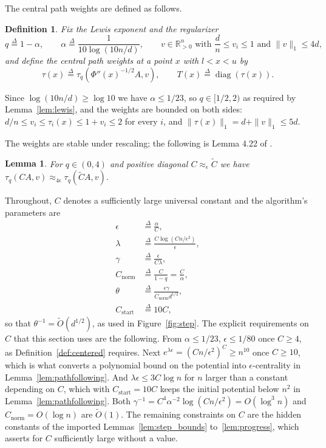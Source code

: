 \documentclass[11pt]{article}
\newtheorem{lemma}{Lemma}[section]
\newtheorem{definition}{Definition}[section]
\newcommand{\R}{\mathbb R}
\newcommand{\diag}{\operatorname{diag}}
\renewcommand{\O}{\widetilde O}
\newcommand{\defeq}{\stackrel{\Delta}{=}}
\newcommand{\Cnorm}{C_{\mathrm{norm}}}
\begin{document}
The central path weights are defined as follows.

\begin{definition}
\label{def:central_weights}
Fix the Lewis exponent and the regularizer
\[
q \defeq 1 - \alpha,
\qquad
\alpha \defeq \frac{1}{10 \log(10 n / d)},
\qquad
v \in \R^{n}_{>0}
\text{ with }
\frac{d}{n} \le v_i \le 1
\text{ and }
\|v\|_1 \le 4 d,
\]
and define the central path weights at a point $x$ with
$l < x < u$ by
\[
\tau(x)
\defeq
\tau_{q}\left( \Phi''(x)^{-1/2} A, v \right),
\qquad
T(x) \defeq \diag(\tau(x)).
\]
\end{definition}

Since $\log(10 n / d) \ge \log 10$ we have
$\alpha \le 1/23$, so
$q \in [1/2, 2)$ as required by Lemma~\ref{lem:lewis}, and the weights are
bounded on both sides: $d / n \le v_i \le \tau_i(x) \le 1 + v_i \le 2$ for every
$i$, and
$\|\tau(x)\|_1 = d + \|v\|_1 \le 5 d$.

The weights are stable under rescaling; the following is Lemma 4.22 of
\cite{BLLSSSW21}.

\begin{lemma}
\label{lem:lewis_approx}
For $q \in (0, 4)$ and positive diagonal
$C \approx_{\epsilon} \widetilde{C}$ we have
$\tau_{q}(C A, v) \approx_{4 \epsilon} \tau_{q}(\widetilde{C} A, v)$.
\end{lemma}

Throughout, $C$ denotes a sufficiently large universal constant and the
algorithm's parameters are
\begin{equation}
\label{eq:parameters}
\begin{aligned}
\epsilon &\defeq \frac{\alpha}{C}, \\
\lambda &\defeq \frac{C \log(C n / \epsilon^2)}{\epsilon}, \\
\gamma &\defeq \frac{\epsilon}{C \lambda}, \\
\Cnorm &\defeq \frac{C}{1 - q} = \frac{C}{\alpha}, \\
\theta &\defeq \frac{\epsilon \gamma}{\Cnorm d^{1/2}}, \\
C_{\mathrm{start}} &\defeq 10 C,
\end{aligned}
\end{equation}
so that $\theta^{-1} = \O(d^{1/2})$, as used in Figure~\ref{fig:step}.
The explicit requirements on $C$ that this section uses are the following.
From $\alpha \le 1/23$,
$\epsilon \le 1/80$ once
$C \ge 4$, as Definition~\ref{def:centered} requires.
Next $e^{\lambda \epsilon} = (C n / \epsilon^2)^{C} \ge n^{10}$ once
$C \ge 10$, which is what converts a polynomial bound on the potential into
$\epsilon$-centrality in Lemma~\ref{lem:pathfollowing}.
And $\lambda \epsilon \le 3 C \log n$ for
$n$ larger than a constant depending on
$C$, which with
$C_{\mathrm{start}} = 10 C$ keeps the initial potential below
$n^{2}$ in Lemma~\ref{lem:pathfollowing}.
Both $\gamma^{-1} = C^{4} \alpha^{-2} \log(C n / \epsilon^2) = O(\log^{3} n)$
and $\Cnorm = O(\log n)$ are
$\O(1)$.
The remaining constraints on $C$ are the hidden constants of the imported
Lemmas~\ref{lem:step_bounds} to~\ref{lem:progress}, which
\cite{BLLSSSW21} asserts for $C$ sufficiently
large without a value.
\end{document}
